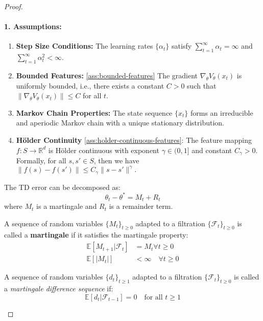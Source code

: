 \begin{proof}
\;\newline
\paragraph{1. Assumptions:}
\begin{enumerate}
    \item \textbf{Step Size Conditions:} The learning rates \( \{\alpha_t\} \) satisfy \( \sum_{t=1}^\infty \alpha_t = \infty \) and \( \sum_{t=1}^\infty \alpha_t^2 < \infty \). 
    \item \textbf{Bounded Features:} \ref{ass:bounded-features} The gradient \( \nabla_\theta V_\theta(x_t) \) is uniformly bounded, i.e., there exists a constant \( C > 0 \) such that \( \|\nabla_\theta V_\theta(x_t)\| \leq C \) for all \( t \).
    \item \textbf{Markov Chain Properties:} The state sequence \( \{x_t\} \) forms an irreducible and aperiodic Markov chain with a unique stationary distribution.
    \item \textbf{Hölder Continuity} \ref{ass:holder-continuous-features}: The feature mapping \( f: S \to \mathbb{R}^d \) is Hölder continuous with exponent \( \gamma \in (0, 1] \) and constant \( C_\gamma > 0 \). Formally, for all \( s, s' \in S \), then we have \(\|f(s) - f(s')\| \leq C_\gamma \|s - s'\|^\gamma.\)
\end{enumerate}
The TD error can be decomposed as:
\[
\theta_t - \theta^* = M_t + R_t
\]
where \( M_t \) is a martingale and \( R_t \) is a remainder term.

\begin{definition}[Martingale]
\label{def:martingale}
A sequence of random variables \( \{M_t\}_{t \geq 0} \) adapted to a filtration \( \{\mathcal{F}_t\}_{t \geq 0} \) is called a \textbf{martingale} if it satisfies the martingale property:
\begin{align*}
\mathbb{E}[M_{t+1} | \mathcal{F}_t] &= M_t \forall t \geq 0\\
\mathbb{E}[|M_{t}|] &< \infty \quad \forall t \geq 0
\end{align*}
\end{definition}

\begin{definition}
\label{def:martingale-difference-sequence}
A sequence of random variables \( \{d_t\}_{t \geq 1} \) adapted to a filtration \( \{\mathcal{F}_t\}_{t \geq 0} \) is called a \emph{martingale difference sequence} if:
\[
\mathbb{E}[d_t | \mathcal{F}_{t-1}] = 0 \quad \text{for all } t \geq 1
\]
\end{definition}



\end{proof}
